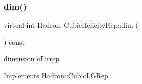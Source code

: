 \mbox{\label{structHadron_1_1CubicHelicityRep_a95d229a05580e65f8bdde74a1e316855}} 
\subsubsection{\texorpdfstring{dim()}{dim()}\hspace{0.1cm}{\footnotesize\ttfamily [2/3]}}
{\footnotesize\ttfamily virtual int Hadron\+::\+Cubic\+Helicity\+Rep\+::dim (\begin{DoxyParamCaption}{ }\end{DoxyParamCaption}) const\hspace{0.3cm}{\ttfamily [pure virtual]}}

dimension of irrep 

Implements \mbox{\hyperlink{structHadron_1_1CubicLGRep_a3acbaea26503ed64f20df693a48e4cdd}{Hadron\+::\+Cubic\+L\+G\+Rep}}.



